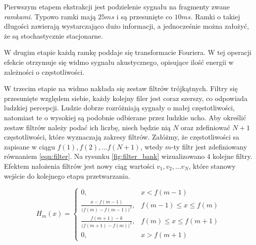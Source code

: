 \documentclass[11pt]{article}
\begin{document}
	 Pierwszym etapem ekstrakcji jest podzielenie sygnału na fragmenty zwane \textit{ramkami}. Typowo ramki mają $25ms$ i są przesunięte co $10ms$. Ramki o takiej długości zawierają wystarczająco dużo informacji, a jednocześnie można założyć, że są stochastycznie stacjonarne. 
	 
	 W drugim etapie każdą ramkę poddaje się transformacie Fouriera. W tej operacji efekcie otrzymuje się widmo sygnału akustycznego, opisujące ilość energii w zależności o częstotliwości.
	 
	 W trzecim etapie na widmo nakłada się zestaw filtrów trójkątnych. Filtry się przesunięte względem siebie, każdy kolejny filer jest coraz szerszy, co odpowiada ludzkiej percepcji. Ludzie dobrze rozróżniają sygnały o małej częstotliwości, natomiast te o wysokiej są podobnie odbierane przez ludzkie ucho. Aby określić zestaw filtrów należy podać ich liczbę, niech będzie nią $N$ oraz zdefiniować $N+1$ częstotliwości, które wyznaczają zakresy filtrów. Załóżmy, że częstotliwości sa zapisane w ciągu $f(1), f(2), \ldots f(N+1)$, wtedy $m$-ty filtr jest zdefiniowany równaniem \ref{eqn:filter}. Na rysunku \ref{fig:filter_bank} wizualizowano $4$ kolejne filtry. Efektem nałożenia filtrów jest nowy ciąg wartości $v_1, v_2, \ldots v_N$, które stanowy wejście do kolejnego etapu przetwarzania.
	 
	 \begin{equation}
		 H_m(x)= 
			 \begin{cases}
				 0,				 					 & x < f(m-1) 		       \\
				 \frac{x - f(m-1)}{\big(f(m) - f(m-1)\big)^2}, & f(m-1) \leq x \leq f(m) \\
				 \frac{f(m+1) - k}{\big(f(m+1) - f(m)\big)^2}, & f(m) \leq x \leq f(m+1) \\
				 0,				 					 & x > f(m+1)
			 \end{cases}
		 \label{eqn:filter}
	 \end{equation}
	 
\end{document}
